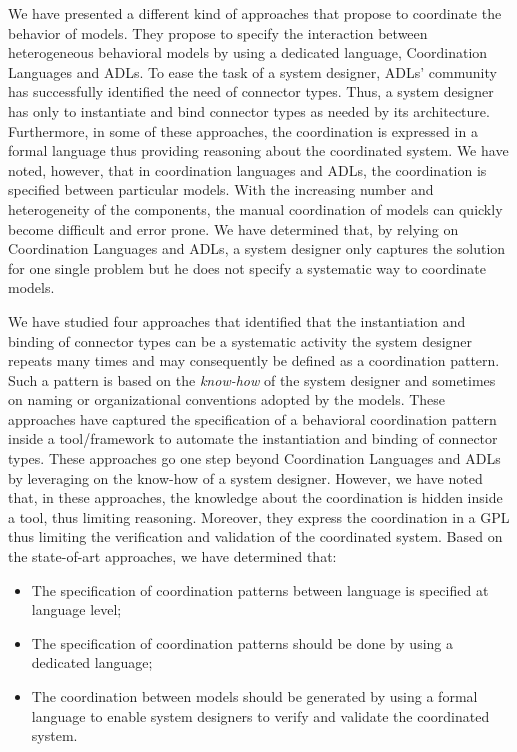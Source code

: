We have presented a different kind of approaches that propose to coordinate the behavior of models. They propose to specify the interaction between heterogeneous behavioral models by using a dedicated language, \ie Coordination Languages and ADLs. To ease the task of a system designer, ADLs' community has successfully identified the need of connector types. Thus, a system designer has only to instantiate and bind connector types as needed by its architecture. Furthermore, in some of these approaches, the coordination is expressed in a formal language thus providing reasoning about the coordinated system. We have noted, however, that in coordination languages and ADLs, the coordination is specified between particular models. With the increasing number and heterogeneity of the components, the manual coordination of models can quickly become difficult and error prone. We have determined that, by relying on Coordination Languages and ADLs, a system designer only captures the solution for one single problem but he does not specify a systematic way to coordinate models. 
 
We have studied four approaches that identified that the instantiation and binding of connector types can be a systematic activity the system designer repeats many times and may consequently be defined as a coordination pattern. Such a pattern is based on the \emph{know-how} of the system designer and sometimes on naming or organizational conventions adopted by the models. These approaches have captured the specification of a behavioral coordination pattern inside a tool/framework to automate the instantiation and binding of connector types. These approaches go one step beyond Coordination Languages and ADLs by leveraging on the know-how of a system designer. However, we have noted that, in these approaches, the knowledge about the coordination is hidden inside a tool, thus limiting reasoning. Moreover, they express the coordination in a GPL thus limiting the verification and validation of the coordinated system. Based on the state-of-art approaches, we have determined that:

\begin{itemize}
\item The specification of coordination patterns between language is specified at language level;
	 
\item The specification of coordination patterns should be done by using a dedicated language; 
	 
\item The coordination between models should be generated by using a formal language to enable system designers to verify and validate the coordinated system. 		
\end{itemize}

